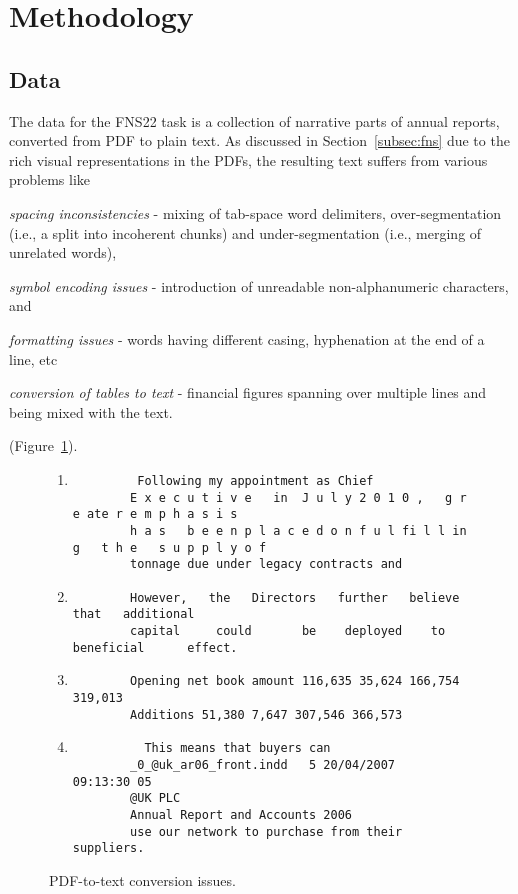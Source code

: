 \section{Methodology}\label{sec:methodology}

\subsection{Data}\label{subsec:data}
The data for the FNS22 task is a collection of narrative parts of annual reports, converted from PDF to plain text.
As discussed in Section~\ref{subsec:fns} due to the rich visual representations in the PDFs, the resulting text suffers from various problems like
\begin{enumerate*}
    \item \emph{spacing inconsistencies} - mixing of tab-space word delimiters, over-segmentation (i.e., a split into incoherent chunks) and under-segmentation (i.e., merging of unrelated words),
    \item \emph{symbol encoding issues} - introduction of unreadable non-alphanumeric characters, and
    \item \emph{formatting issues} - words having different casing, hyphenation at the end of a line, etc
    \item \emph{conversion of tables to text} - financial figures spanning over multiple lines and being mixed with the text.
\end{enumerate*} (Figure~\ref{fig:pdf_to_text}).

\begin{figure}[ht]
    \centering
    \begin{enumerate}
        \item \begin{verbatim}
         Following my appointment as Chief
        E x e c u t i v e	in	J u l y	2 0 1 0 ,	g r e ate r	e m p h a s i s
        h a s	b e e n	p l a c e d	o n	f u l fi l l in g	t h e	s u p p l y	o f
        tonnage due under legacy contracts and
    \end{verbatim}
    \item \begin{verbatim}
        However,   the   Directors   further   believe   that   additional
        capital   	could   	be	  deployed	  to 	beneficial   	effect.
    \end{verbatim}
    \item \begin{verbatim}
        Opening net book amount 116,635 35,624 166,754 319,013
        Additions 51,380 7,647 307,546 366,573
    \end{verbatim}
    \item \begin{verbatim}
          This means that buyers can
        _0_@uk_ar06_front.indd   5 20/04/2007   09:13:30 05
        @UK PLC
        Annual Report and Accounts 2006
        use our network to purchase from their suppliers.
    \end{verbatim}
    \end{enumerate}
    \caption{PDF-to-text conversion issues.}
    \label{fig:pdf_to_text}
\end{figure}

